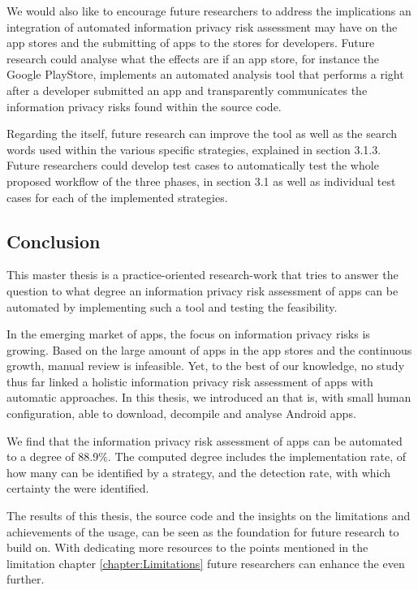 We would also like to encourage future researchers to address the implications an integration of automated information privacy risk assessment may have on the app stores and the submitting of apps to the stores for developers.
Future research could analyse what the effects are if an app store, for instance the Google PlayStore, implements an automated \ipr analysis tool that performs a \sca right after a developer submitted an app and transparently communicates the information privacy risks found within the source code.

Regarding the \aiprat itself, future research can improve the tool as well as the search words used within the various specific strategies, explained in section 3.1.3.
Future researchers could develop test cases to automatically test the whole proposed workflow of the three phases, in section 3.1 as well as individual test cases for each of the implemented strategies.

\subsection{Conclusion}

This master thesis is a practice-oriented research-work that tries to answer the question to what degree an information privacy risk assessment of \mH apps can be automated by implementing such a tool and testing the feasibility.

In the emerging market of \mH apps, the focus on information privacy risks is growing.
Based on the large amount of apps in the app stores and the continuous growth, manual review is infeasible.
Yet, to the best of our knowledge, no study thus far linked a holistic information privacy risk assessment of \mH apps with automatic \sca approaches.
In this thesis, we introduced an \aiprat that is, with small human configuration, able to download, decompile and analyse Android \mH apps.

We find that the information privacy risk assessment of \mH apps can be automated to a degree of 88.9\%.
The computed degree includes the implementation rate, of how many \ipr can be identified by a \sca strategy, and the detection rate, with which certainty the \ipr were identified.

The results of this thesis, the \aiprat source code and the insights on the limitations and achievements of the \sca usage, can be seen as the foundation for future research to build on.
With dedicating more resources to the points mentioned in the limitation chapter \ref{chapter:Limitations} future researchers can enhance the \aiprat even further.